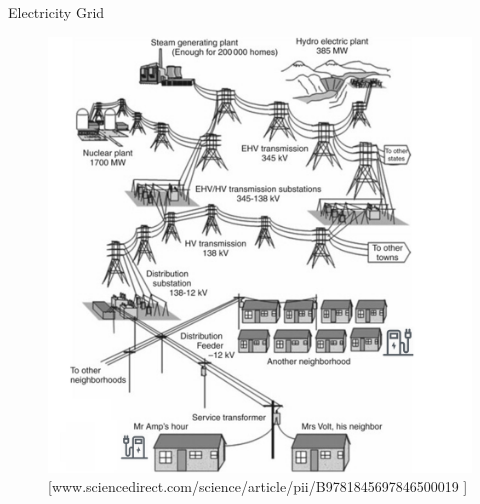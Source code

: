 \documentclass{beamer}
\begin{document}
\begin{frame}{Electricity Grid}
\begin{figure}[!htbp]
\centering
\includegraphics[width=2.8 in , height=2.4 in]{Figures/EVchalendge1.png}
\caption{\tiny[www.sciencedirect.com/science/article/pii/B9781845697846500019 ]}
\end{figure}
\end{frame}


%

\end{document}

